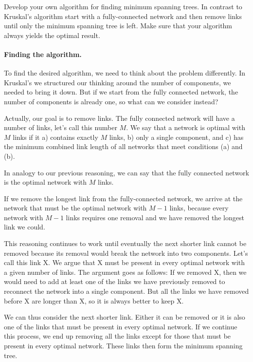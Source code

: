 



Develop your own algorithm for finding minimum spanning trees. In contrast to Kruskal's algorithm start with a fully-connected network and then remove links until only the minimum spanning tree is left. Make sure that your algorithm always yields the optimal result.


\solution
\paragraph{Finding the algorithm.}To find the desired algorithm, we need to think about the problem differently. In Kruskal's we structured our thinking around the number of components, we needed to bring it down. But if we start from the fully connected network, the number of components is already one, so what can we consider instead? 

Actually, our goal is to remove links. The fully connected network will have a number of links, let's call this number $M$. 
We say that a network is optimal with $M$ links if it a) contains exactly $M$ links, b) only a single component, and c) has the minimum combined link length of all networks that meet conditions (a) and (b).

In analogy to our previous reasoning, we can say that the fully connected network is the optimal network with $M$ links.

If we remove the longest link from the fully-connected network, we arrive at the network that must be the optimal network with $M-1$ links, because every network with $M-1$ links requires one removal 
and we have removed the longest link we could. 

This reasoning continues to work until eventually the next shorter link cannot be removed because its removal would break the network into two components. Let's call this link X. We argue that X must be present in every optimal network with a given number of links. The argument goes as follows: If we removed X, then we would need to add at least one of the links we have previously removed to reconnect the network into a single component. But all the links we have removed before X are longer than X, so it is always better to keep X. 

We can thus consider the next shorter link. Either it can be removed or it is also one of the links that must be present in every optimal network. If we continue this process, we end up removing all the links except for those that must be present in every optimal network. These links then form the minimum spanning tree. 


